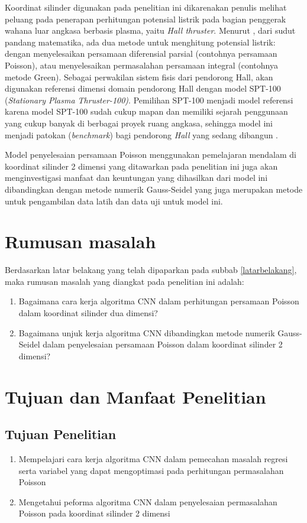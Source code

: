 Koordinat silinder digunakan pada penelitian ini dikarenakan penulis melihat peluang pada penerapan perhitungan potensial listrik pada bagian penggerak wahana luar angkasa berbasis plasma, yaitu \emph{Hall thruster}. Menurut \cite{cohl_1999}, dari sudut pandang matematika, ada dua metode untuk menghitung potensial listrik: dengan menyelesaikan persamaan diferensial parsial (contohnya persamaan Poisson), atau menyelesaikan permasalahan persamaan integral (contohnya metode Green). Sebagai perwakilan sistem fisis dari pendorong Hall, akan digunakan referensi dimensi domain pendorong Hall dengan model SPT-100 (\emph{Stationary Plasma Thruster-100)}. Pemilihan SPT-100 menjadi model referensi karena model SPT-100 sudah cukup mapan dan memiliki sejarah penggunaan yang cukup banyak di berbagai proyek ruang angkasa, sehingga model ini menjadi patokan (\emph{benchmark}) bagi pendorong \emph{Hall} yang sedang dibangun \citep{braga_miranda_2019}.

Model penyelesaian persamaan Poisson menggunakan pemelajaran mendalam di koordinat silinder 2 dimensi yang ditawarkan pada penelitian ini juga akan menginvestigasi manfaat dan keuntungan yang dihasilkan dari model ini dibandingkan dengan metode numerik Gauss-Seidel yang juga merupakan metode untuk pengambilan data latih dan data uji untuk model ini. 

\section{Rumusan masalah}
Berdasarkan latar belakang yang telah dipaparkan pada subbab \ref{latarbelakang}, maka rumusan masalah yang diangkat pada penelitian ini adalah:
\begin{enumerate}
    \item Bagaimana cara kerja algoritma CNN dalam perhitungan persamaan Poisson dalam koordinat silinder dua dimensi?
    \item Bagaimana unjuk kerja algoritma CNN dibandingkan metode numerik Gauss-Seidel dalam penyelesaian persamaan Poisson dalam koordinat silinder 2 dimensi?
\end{enumerate}

\section{Tujuan dan Manfaat Penelitian}
\subsection{Tujuan Penelitian}
\begin{enumerate}
    \item Mempelajari cara kerja algoritma CNN dalam pemecahan masalah regresi serta variabel yang dapat mengoptimasi pada perhitungan permasalahan Poisson
    \item Mengetahui peforma algoritma CNN dalam penyelesaian permasalahan Poisson pada koordinat silinder 2 dimensi
\end{enumerate}

